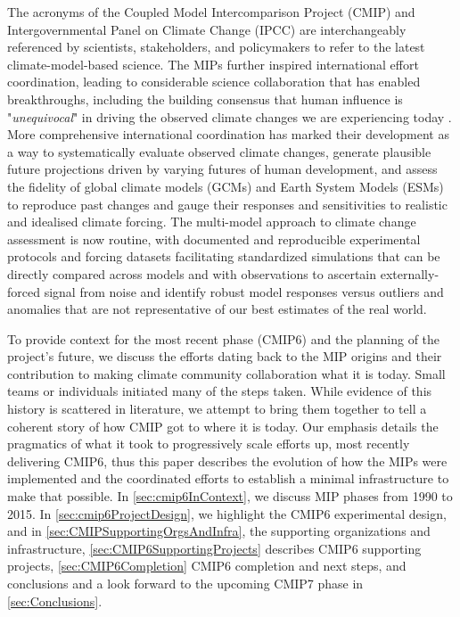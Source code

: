 \documentclass[gmd, preprint]{copernicus}
\begin{document}
The acronyms of the Coupled Model Intercomparison Project (CMIP) and Intergovernmental Panel on Climate Change (IPCC) are interchangeably referenced by scientists, stakeholders, and policymakers to refer to the latest climate-model-based science. The MIPs further inspired international effort coordination, leading to considerable science collaboration that has enabled breakthroughs, including the building consensus that human influence is "\textit{unequivocal}" in driving the observed climate changes we are experiencing today \citep[see \autoref{fig:fig6-MIPImpact};][]{eyring_human_2021}. More comprehensive international coordination has marked their development as a way to systematically evaluate observed climate changes, generate plausible future projections driven by varying futures of human development, and assess the fidelity of global climate models (GCMs) and Earth System Models (ESMs) to reproduce past changes and gauge their responses and sensitivities to realistic and idealised climate forcing. The multi-model approach to climate change assessment is now routine, with documented and reproducible experimental protocols and forcing datasets facilitating standardized simulations that can be directly compared across models and with observations to ascertain externally-forced signal from noise and identify robust model responses versus outliers and anomalies that are not representative of our best estimates of the real world.

To provide context for the most recent phase (CMIP6) and the planning of the project’s future, we discuss the efforts dating back to the MIP origins and their contribution to making climate community collaboration what it is today. Small teams or individuals initiated many of the steps taken. While evidence of this history is scattered in literature, we attempt to bring them together to tell a coherent story of how CMIP got to where it is today. Our emphasis details the pragmatics of what it took to progressively scale efforts up, most recently delivering CMIP6, thus this paper describes the evolution of how the MIPs were implemented and the coordinated efforts to establish a minimal infrastructure to make that possible. In \autoref{sec:cmip6InContext}, we discuss MIP phases from 1990 to 2015. In \autoref{sec:cmip6ProjectDesign}, we highlight the CMIP6 experimental design, and in \autoref{sec:CMIPSupportingOrgsAndInfra}, the supporting organizations and infrastructure, \autoref{sec:CMIP6SupportingProjects} describes CMIP6 supporting projects, \autoref{sec:CMIP6Completion} CMIP6 completion and next steps, and conclusions and a look forward to the upcoming CMIP7 phase in \autoref{sec:Conclusions}.
\end{document}

